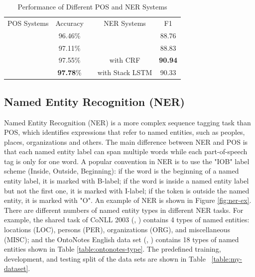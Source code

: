 \begin{table}[]
\centering
\caption{Performance of Different POS and NER Systems}
\label{table:my-performance}
\begin{tabular}{cclcc}
POS Systems       & Accuracy &  & NER Systems           & F1
\\ \cline{1-2} \cline{4-5} 
\text{\cite{mccallum2000maximum}} & 96.46\%                      &  & \text{\cite{florian2003named}}                 & 88.76                  \\
\text{\cite{collins2002discriminative}}    & 97.11\%                      &  & \text{\cite{huang2015bidirectional}}           & 88.83                  \\
\text{\cite{huang2015bidirectional}}       & 97.55\%                      &  & \text{\cite{lample2016neural}} with CRF        & \textbf{90.94}                 \\
\text{\cite{ling2015finding}}              & \textbf{97.78}\%                      &  & \text{\cite{lample2016neural}} with Stack LSTM & 90.33                 
\end{tabular}
\end{table}



\subsection{Named Entity Recognition (NER)}

Named Entity Recognition (NER) is a more complex sequence tagging task than POS, which identifies expressions
that refer to named entities, such as peoples, places, organizations and others. The main difference between NER and POS is that each named entity label can span multiple words while each part-of-speech tag is only for one word. A popular convention in NER is to use the "IOB" label scheme (Inside, Outside, Beginning): if the word is the beginning of a named entity label, it is marked with B-label; if the word is inside a named entity label but not the first one, it is marked with I-label; if the token is outside the named entity, it is marked with "O". An example of NER is shown in Figure \ref{fig:ner-ex}. There are different numbers of named entity types in different NER tasks. For example, the shared task of CoNLL 2003 (\citeauthor{tjong2003introduction}, \citeyear{tjong2003introduction}) contains 4 types of named entities: locations (LOC), persons (PER), organizations (ORG), and miscellaneous (MISC); and the OntoNotes English data set (\citeauthor{hovy2006ontonotes}, \citeyear{hovy2006ontonotes}) contains 18 types of named entities shown in Table \ref{table:ontonotes-type}. The predefined training, development, and testing split of the data sets are shown in Table ~\ref{table:my-dataset}.


